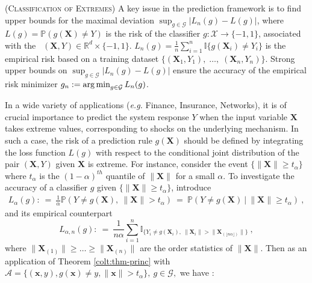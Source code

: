 \begin{remark} \label{colt:rk:prediction}(\textsc{Classification of Extremes})
A key issue in the prediction framework is to find upper bounds for the maximal deviation $\sup_{g \in \mathcal{G}}|L_n(g) - L(g)|$, where $L(g) = \mathbb{P}(g(\mathbf{X}) \neq Y)$ is the risk of the classifier $g: \mathcal{X} \to \{-1, 1\}$, associated with the \rv~$(\mathbf{X},Y) \in \mathbb{R}^d \times \{-1,1\}$. $L_n(g) = \frac{1}{n} \sum_{i=1}^n \mathds{I}\{g(\mathbf{X}_i)\neq Y_i\} $ is the empirical risk based on a training dataset $\{(\mathbf{X}_1,Y_1),\; \ldots,\; (\mathbf{X}_n,Y_n)  \}$. Strong upper bounds on $\sup_{g \in \mathcal{G}}|L_n(g) - L(g)|$ ensure the accuracy of the empirical risk minimizer $g_n:= \argmin_{g \in \mathcal{G}}L_n(g)$. 

In a wide variety of applications (\textit{e.g.} Finance, Insurance, Networks), it is of crucial importance to predict the system response $Y$ when the input variable $\mathbf{X}$ takes extreme values, corresponding to shocks on the underlying mechanism. In such a case, the risk of a prediction rule $g(\mathbf{X})$ should be defined by integrating the loss function $L(g)$ with respect to the conditional joint distribution of the pair $(\mathbf{X},Y)$ given $\mathbf{X}$ is extreme. For instance, consider the event $\{\|\mathbf{X}\| \ge t_\alpha\}$ where $t_\alpha$ is the $(1-\alpha)^{th}$ quantile of $\|\mathbf{X}\|$ for a small $\alpha$. To investigate the accuracy of a classifier $g$ given $\{\|\mathbf{X}\| \ge t_\alpha\}$,
introduce 
\begin{align*}
L_{\alpha}(g):~=~ \frac{1}{\alpha}\mathbb{P}\left(Y\neq g(\mathbf{X}),~ \| \mathbf{X}\|>t_\alpha \right)~=~\mathbb{P}\left(Y \neq g(\mathbf{X}) ~\big|~ \|\mathbf{X}\| \ge t_\alpha \right)~,
\end{align*}
\noindent
 and its empirical
 counterpart \[L_{\alpha,n}(g):~=~\frac{1}{n\alpha}\sum_{i=1}^n\mathds{I}_{\{Y_i\neq
   g(\mathbf{X}_i),~ \| \mathbf{X}_i\| > \|  \mathbf{X}_{(\lfloor n\alpha \rfloor)} \|  \}}~,\]
 where $\| \mathbf{X}_{(1)}\| \geq \ldots \geq \| \mathbf{X}_{(n)}\|$ are the order
 statistics of $\| \mathbf{X}\|$. Then as an application of Theorem \ref{colt:thm-princ} with $\mathcal{A} = \{(\mathbf{x},y), g(\mathbf{x}) \neq y, \|\mathbf{x}\| > t_\alpha\},~g\in\mathcal{G},$ we have : 
\begin{align}
\label{colt:prediction:rates}

\end{align}
\end{remark}
